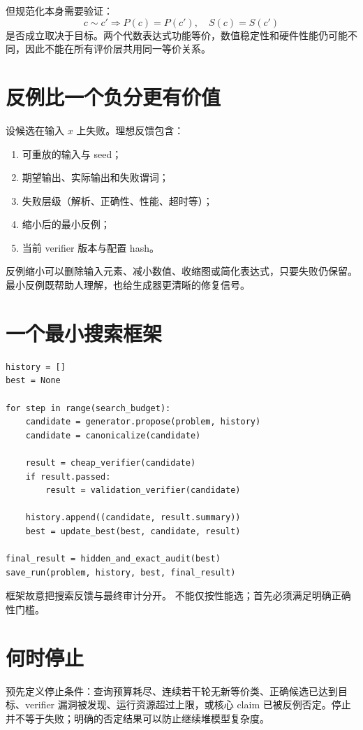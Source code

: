 但规范化本身需要验证：
\[
c\sim c'\Rightarrow
P(c)=P(c'),\quad S(c)=S(c')
\]
是否成立取决于目标。两个代数表达式功能等价，数值稳定性和硬件性能仍可能不同，因此不能在所有评价层共用同一等价关系。

\section{反例比一个负分更有价值}

设候选在输入 $x$ 上失败。理想反馈包含：
\begin{enumerate}
  \item 可重放的输入与 seed；
  \item 期望输出、实际输出和失败谓词；
  \item 失败层级（解析、正确性、性能、超时等）；
  \item 缩小后的最小反例；
  \item 当前 verifier 版本与配置 hash。
\end{enumerate}

反例缩小可以删除输入元素、减小数值、收缩图或简化表达式，只要失败仍保留。最小反例既帮助人理解，也给生成器更清晰的修复信号。

\section{一个最小搜索框架}

\begin{lstlisting}
history = []
best = None

for step in range(search_budget):
    candidate = generator.propose(problem, history)
    candidate = canonicalize(candidate)

    result = cheap_verifier(candidate)
    if result.passed:
        result = validation_verifier(candidate)

    history.append((candidate, result.summary))
    best = update_best(best, candidate, result)

final_result = hidden_and_exact_audit(best)
save_run(problem, history, best, final_result)
\end{lstlisting}
框架故意把搜索反馈与最终审计分开。 不能仅按性能选；首先必须满足明确正确性门槛。

\section{何时停止}

预先定义停止条件：查询预算耗尽、连续若干轮无新等价类、正确候选已达到目标、verifier 漏洞被发现、运行资源超过上限，或核心 claim 已被反例否定。停止并不等于失败；明确的否定结果可以防止继续堆模型复杂度。

